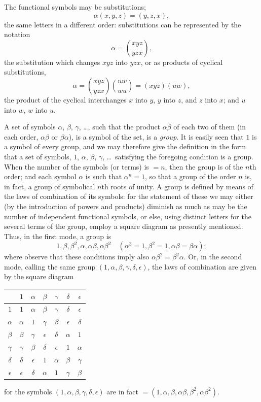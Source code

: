 \documentclass[11pt,a4paper]{article}
\begin{document}
\clearpage
The functional symbols may be substitutions;
\[
\alpha(x, y, z) = (y, z, x),
\]
the same letters in a different order: substitutions can be represented by the notation
\[
\alpha = \binom{xyz}{yzx},
\]
the substitution which changes $xyz$ into $yzx$, or as products of cyclical substitutions,
\[
\alpha = \binom{xyz}{yzx}\binom{uw}{wu} = (xyz)(uw),
\]
the product of the cyclical interchanges $x$ into $y$, $y$ into $z$, and $z$ into $x$; and $u$ into $w$, $w$ into $u$.

A set of symbols $\alpha$, $\beta$, $\gamma$, \dots, such that the product $\alpha\beta$ of each two of them (in each order, $\alpha\beta$ or $\beta\alpha$), is a symbol of the set, is a \textit{group}. It is easily seen that $1$ is a symbol of every group, and we may therefore give the definition in the form that a set of symbols, $1$, $\alpha$, $\beta$, $\gamma$, \dots\ satisfying the foregoing condition is a group. When the number of the symbols (or terms) is $= n$, then the group is of the $n$th order; and each symbol $\alpha$ is such that $\alpha^n = 1$, so that a group of the order $n$ is, in fact, a group of symbolical $n$th roots of unity. A group is defined by means of the laws of combination of its symbols: for the statement of these we may either (by the introduction of powers and products) diminish as much as may be the number of independent functional symbols, or else, using distinct letters for the several terms of the group, employ a square diagram as presently mentioned. Thus, in the first mode, a group is
\[
1, \beta, \beta^2, \alpha, \alpha\beta, \alpha\beta^2
\quad (\alpha^3 = 1, \beta^2 = 1, \alpha\beta = \beta\alpha);
\]
where observe that these conditions imply also $\alpha\beta^2 = \beta^2\alpha$. Or, in the second mode, calling the same group $(1, \alpha, \beta, \gamma, \delta, \epsilon)$, the laws of combination are given by the square diagram
\begin{center}
\begin{tabular}{c|cccccc}
& $1$ & $\alpha$ & $\beta$ & $\gamma$ & $\delta$ & $\epsilon$ \\
\hline
$1$ & $1$ & $\alpha$ & $\beta$ & $\gamma$ & $\delta$ & $\epsilon$ \\
$\alpha$ & $\alpha$ & $1$ & $\gamma$ & $\beta$ & $\epsilon$ & $\delta$ \\
$\beta$ & $\beta$ & $\gamma$ & $\epsilon$ & $\delta$ & $\alpha$ & $1$ \\
$\gamma$ & $\gamma$ & $\beta$ & $\delta$ & $\epsilon$ & $1$ & $\alpha$ \\
$\delta$ & $\delta$ & $\epsilon$ & $1$ & $\alpha$ & $\beta$ & $\gamma$ \\
$\epsilon$ & $\epsilon$ & $\delta$ & $\alpha$ & $1$ & $\gamma$ & $\beta$
\end{tabular}
\end{center}
for the symbols $(1, \alpha, \beta, \gamma, \delta, \epsilon)$ are in fact $= (1, \alpha, \beta, \alpha\beta, \beta^2, \alpha\beta^2)$.
\end{document}
